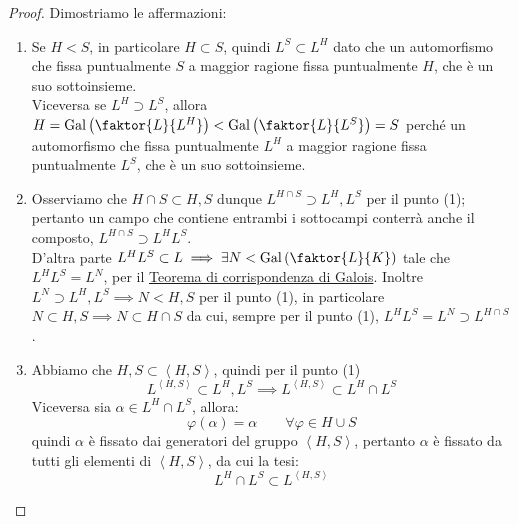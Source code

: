 \documentclass[11pt]{scrartcl}
\begin{document}
\begin{proof}
Dimostriamo le affermazioni:
\begin{enumerate}[(1)]
    \item Se $H < S$, in particolare $H \subset S$, 
    quindi $L^S \subset L^H$ dato che un automorfismo che fissa puntualmente $S$ a maggior ragione fissa puntualmente $H$, che è un suo sottoinsieme. \\
    Viceversa se $L^H \supset L^S$, allora $H = \Gal\left(\faktor{L}{L^H}\right) < \Gal\left(\faktor{L}{L^S}\right) = S$ 
    perché un automorfismo che fissa puntualmente $L^H$ a maggior ragione fissa puntualmente $L^S$, che è un suo sottoinsieme.
    \item Osserviamo che $H \cap S \subset H,S$ dunque $L^{H\cap S} \supset L^H,L^S$ per il punto (1); 
    pertanto un campo che contiene entrambi i sottocampi conterrà anche il composto, $L^{H \cap S} \supset L^H L^S$. \\
    D'altra parte $L^H L^S \subset L \implies \exists N < \Gal\left(\faktor{L}{K}\right)$ tale che $L^H L^S = L^N$, 
    per il \hyperref[corrG]{Teorema di corrispondenza di Galois}. 
    Inoltre $L^N \supset L^H,L^S \implies N < H,S$ per il punto (1), 
    in particolare $N \subset H,S \implies N \subset H \cap S$ da cui, sempre per il punto (1), $L^H L^S = L^N \supset L^{H \cap S}$.
    \item Abbiamo che $H,S \subset \left<H,S\right>$, 
    quindi per il punto (1)
    \[ L^{\left<H,S\right>} \subset L^H,L^S \implies L^{\left<H,S\right>} \subset L^H \cap L^S
        \]
    Viceversa sia $\alpha \in L^H \cap L^S$, allora: 
    \[ \varphi(\alpha) = \alpha \qquad \forall \varphi \in H \cup S
        \]
    quindi $\alpha$ è fissato dai generatori del gruppo $\left<H,S\right>$, 
    pertanto $\alpha$ è fissato da tutti gli elementi di $\left<H,S\right>$, da cui la tesi:
    \[ L^H \cap L^S \subset L^{\left<H,S\right>}
        \]
\end{enumerate}
\end{proof}
\end{document}
